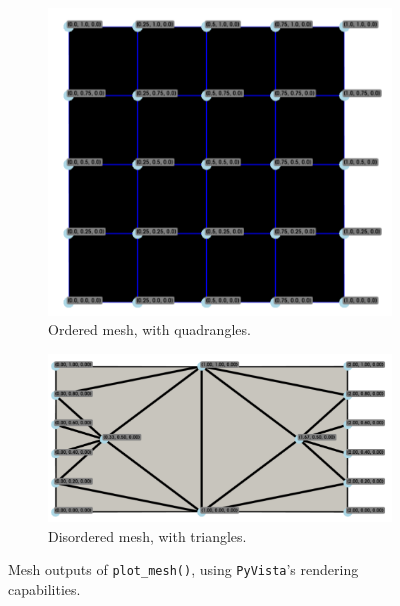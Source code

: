 \documentclass[headings=standardclasses, abstract=true]{scrartcl}
\begin{document}
\begin{figure}[H]
    \centering
    \hfill
    \begin{subfigure}[c]{0.3\textwidth}
        \centering
        \includegraphics[width=\textwidth]{figures/PyVistaMesh_Customized.png}
        \caption{Ordered mesh, with quadrangles.}
        \label{fig:PyVistaMesh1}
    \end{subfigure}
    \hspace{0.1\textwidth}
    \begin{subfigure}[c]{0.4\textwidth}
        \centering
        \includegraphics[width=\textwidth]{figures/PyVistaMesh_Customized2.png}
        \caption{Disordered mesh, with triangles.}
        \label{fig:PyVistaMesh2}
    \end{subfigure}
    \caption{Mesh outputs of \texttt{plot\_mesh()}, using \texttt{PyVista}'s rendering capabilities.}
    \label{fig:PyVistaMesh}
    \hfill
\end{figure}
\end{document}
